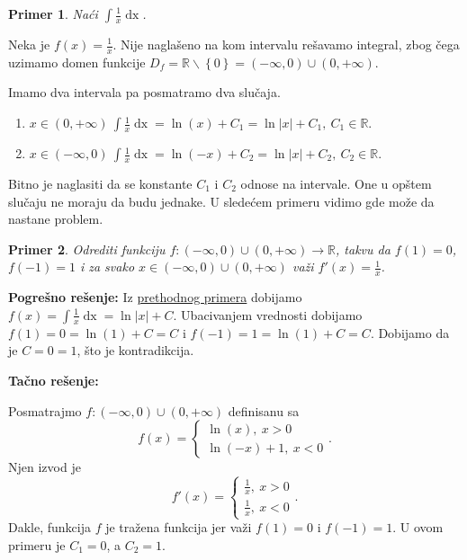 \documentclass{article}
\newtheorem{prim}{Primer}[section]
\DeclareMathOperator{\dx}{dx}
\begin{document}
\begin{primbox}
    \label{primer_1.4}
    \begin{prim}
        Naći $\displaystyle\int\frac{1}{x}\dx$.
    \end{prim}
    Neka je $\displaystyle f\left(x\right) = \frac{1}{x}$. Nije naglašeno na kom
    intervalu rešavamo integral, zbog čega uzimamo domen funkcije $D_f=
        \mathbb{R}\backslash\left\{0\right\}=\left(-\infty,0\right)\cup\left(0,+\infty\right)$.\par
    Imamo dva intervala pa posmatramo dva slučaja.
    \begin{enumerate}[leftmargin=2cm, label=\arabic*. slučaj:]
        \item $\displaystyle x\in\left(0,+\infty\right)\ \int\frac{1}{x}\dx=\ln\left(x\right)+C_1=
                  \ln|x|+C_1,\ C_1\in\mathbb{R}$.
        \item $\displaystyle x\in\left(-\infty,0\right)\ \int\frac{1}{x}\dx=\ln\left(-x\right)+C_2=
                  \ln|x|+C_2,\ C_2\in\mathbb{R}$.
    \end{enumerate}
\end{primbox}

Bitno je naglasiti da se konstante $C_1$ i $C_2$ odnose na intervale. One u opštem
slučaju ne moraju da budu jednake. U sledećem primeru vidimo gde može da nastane
problem.

\begin{primbox}
    \label{primer_1.5}
    \begin{prim}
        Odrediti funkciju $f:\left(-\infty,0\right)\cup\left(0,+\infty\right)\longrightarrow
            \mathbb{R}$, takvu da $f\left(1\right) = 0$, $f\left(-1\right)=1$ i za svako
        $x\in\left(-\infty,0\right)\cup\left(0, +\infty\right)$ važi
        $\displaystyle f'\left(x\right)=\frac{1}{x}$.
    \end{prim}
    \textbf{Pogrešno rešenje:} Iz \hyperref[primer_1.4]{prethodnog primera} dobijamo
    $\displaystyle f\left(x\right)=\int\frac{1}{x}\dx=\ln|x|+C$. Ubacivanjem vrednosti
    dobijamo $f\left(1\right)=0=\ln\left(1\right)+C=C$ i
    $f\left(-1\right)=1=\ln\left(1\right)+C=C$. Dobijamo da je $C=0=1$, što je kontradikcija.\par
    \textbf{Tačno rešenje:}\par
    Posmatrajmo $f:\left(-\infty,0\right)\cup\left(0,+\infty\right)$ definisanu sa
    $$
        f\left(x\right)=
        \begin{cases}
            \ln\left(x\right),\ x>0 \\
            \ln\left(-x\right)+1,\ x<0
        \end{cases}.
    $$
    Njen izvod je
    $$
        f'\left(x\right)=
        \begin{cases}
            \frac{1}{x},\ x>0 \\
            \frac{1}{x},\ x<0
        \end{cases}.
    $$
    Dakle, funkcija $f$ je tražena funkcija jer važi $f\left(1\right)=0$ i $f\left(-1\right)=1$.
    U ovom primeru je $C_1=0$, a $C_2=1$.
\end{primbox}
\end{document}
